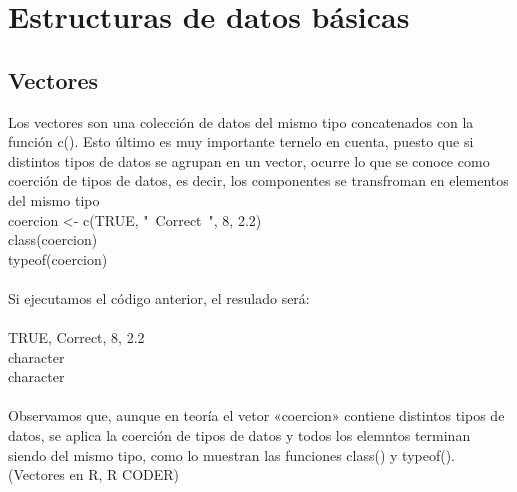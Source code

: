 \documentclass{article}
\begin{document}
\section{Estructuras de datos básicas}

\subsection{Vectores}
Los vectores son una colección de datos del mismo tipo concatenados con la función c(). Esto último es muy importante ternelo en cuenta, puesto que si distintos tipos de datos se agrupan en un vector, ocurre lo que se conoce como coerción de tipos de datos, es decir, los componentes se transfroman en elementos del mismo tipo   \\coercion <- c(TRUE, "\ Correct\ ", 8, 2.2)\\
class(coercion)\\
typeof(coercion)\\
\\Si ejecutamos el código anterior, el resulado será:\\
\\TRUE, Correct, 8, 2.2\\
character\\
character\\
\\Observamos que, aunque en teoría el vetor «coercion» contiene distintos tipos de datos, se aplica la coerción de tipos de datos y todos los elemntos terminan siendo del mismo tipo, como lo muestran las funciones class() y typeof(). (Vectores en R, R CODER) \\
\end{document}
